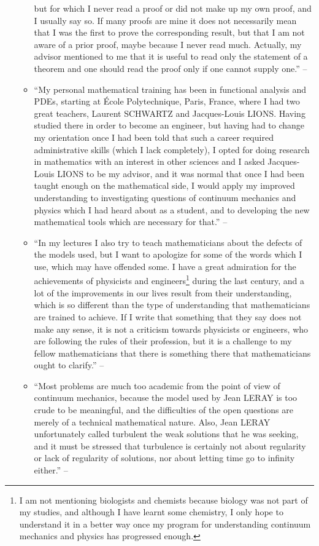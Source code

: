 \documentclass{article}
\numberwithin{equation}{section}
\begin{document}
\begin{enumerate}
\begin{itemize}
but for which I never read a proof or did not make up my own proof, and I usually say so. If many proofs are mine it does not necessarily mean that I was the first to prove the corresponding result, but that I am not aware of a prior proof, maybe because I never read much. Actually, my advisor mentioned to me that it is useful to read only the statement of a theorem and one should read the proof only if one cannot supply one.'' -- \cite[Preface, pp. xii--xiii]{Tartar2006}
		\item ``My personal mathematical training has been in functional analysis and PDEs, starting at \'Ecole Polytechnique, Paris, France, where I had two great teachers, Laurent SCHWARTZ and Jacques-Louis LIONS. Having studied there in order to become an engineer, but having had to change my orientation once I had been told that such a career required administrative skills (which I lack completely), I opted for doing research in mathematics with an interest in other sciences and I asked Jacques-Louis LIONS to be my advisor, and it was normal that once I had been taught enough on the mathematical side, I would apply my improved understanding to investigating questions of continuum mechanics and physics which I had heard about as a student, and to developing the new mathematical tools which are necessary for that.'' -- \cite[Preface, p. xiii]{Tartar2006}
		\item ``In my lectures I also try to teach mathematicians about the defects of the models used, but I want to apologize for some of the words which I use, which may have offended some. I have a great admiration for the achievements of physicists and engineers\footnote{I am not mentioning biologists and chemists because biology was not part of my studies, and although I have learnt some chemistry, I only hope to understand it in a better way once my program for understanding continuum mechanics and physics has progressed enough.} during the last century, and a lot of the improvements in our lives result from their understanding, which is so different than the type of understanding that mathematicians are trained to achieve. If I write that something that they say does not make any sense, it is not a criticism towards physicists or engineers, who are following the rules of their profession, but it is a challenge to my fellow mathematicians that there is something there that mathematicians ought to clarify.'' -- \cite[Preface, p. xiii]{Tartar2006}
		\item ``Most problems are much too academic from the point of view of continuum mechanics, because the model used by Jean LERAY is too crude to be meaningful, and the difficulties of the open questions are merely of a technical mathematical nature. Also, Jean LERAY unfortunately called turbulent the weak solutions that he was seeking, and it must be stressed that turbulence is certainly not about regularity or lack of regularity of solutions, nor about letting time go to infinity either.'' -- \cite[Introduction, p. xv]{Tartar2006}

\end{itemize}
\end{enumerate}
\end{document}
